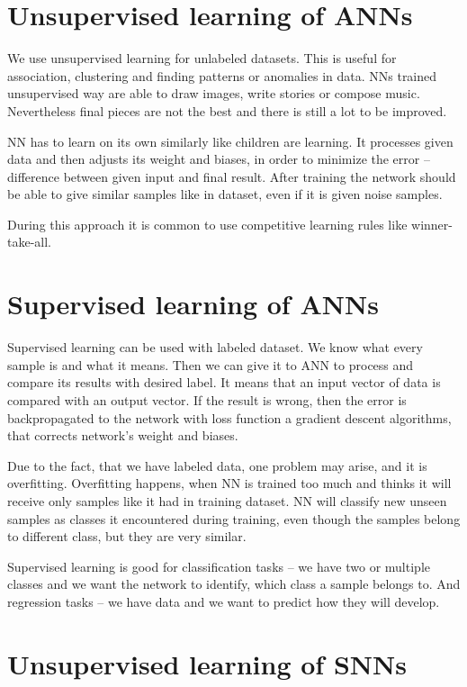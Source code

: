 \section{Unsupervised learning of ANNs}%
\label{sec:unsupervised_ann}

We use unsupervised learning for unlabeled datasets. This is useful for association, clustering and finding patterns or anomalies in data. NNs trained unsupervised way are able to draw images, write stories or compose music. Nevertheless final pieces are not the best and there is still a lot to be improved.

NN has to learn on its own similarly like children are learning. It processes given data and then adjusts its weight and biases, in order to minimize the error -- difference between given input and final result. After training the network should be able to give similar samples like in dataset, even if it is given noise samples.

During this approach it is common to use competitive learning rules like winner-take-all.


\section{Supervised learning of ANNs}%
\label{sec:supervised_ann}

Supervised learning can be used with labeled dataset. We know what every sample is and what it means. Then we can give it to ANN to process and compare its results with desired label. It means that an input vector of data is compared with an output vector. If the result is wrong, then the error is backpropagated to the network with loss function a gradient descent algorithms, that corrects network's weight and biases.

Due to the fact, that we have labeled data, one problem may arise, and it is overfitting. Overfitting happens, when NN is trained too much and thinks it will receive only samples like it had in training dataset. NN will classify new unseen samples as classes it encountered during training, even though the samples belong to different class, but they are very similar.

Supervised learning is good for classification tasks -- we have two or multiple classes and we want the network to identify, which class a sample belongs to. And regression tasks -- we have data and we want to predict how they will develop.


\section{Unsupervised learning of SNNs}%
\label{sec:unsupervised_snn}

